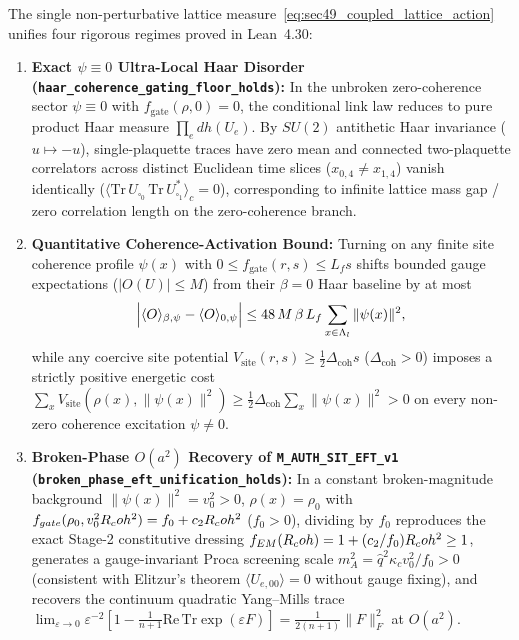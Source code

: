The single non-perturbative lattice measure~\eqref{eq:sec49_coupled_lattice_action} unifies four rigorous regimes proved in Lean~4.30:
\begin{enumerate}[leftmargin=2em]
  \item \textbf{Exact $\psi \equiv 0$ Ultra-Local Haar Disorder (\texttt{haar\_\allowbreak{}coherence\_\allowbreak{}gating\_\allowbreak{}floor\_\allowbreak{}holds}):} In the unbroken zero-coherence sector $\psi \equiv 0$ with $f_{\mathrm{gate}}(\rho,0) = 0$, the conditional link law reduces to pure product Haar measure $\prod_e dh(U_e)$. By $SU(2)$ antithetic Haar invariance ($u \mapsto -u$), single-plaquette traces have zero mean and connected two-plaquette correlators across distinct Euclidean time slices ($x_{0,4} \ne x_{1,4}$) vanish identically ($\langle \mathrm{Tr}\,U_{\square_0}\,\mathrm{Tr}\,U_{\square_1}^*\rangle_c = 0$), corresponding to infinite lattice mass gap / zero correlation length on the zero-coherence branch.
  \item \textbf{Quantitative Coherence-Activation Bound:} Turning on any finite site coherence profile $\psi(x)$ with $0 \le f_{\mathrm{gate}}(r,s) \le L_f s$ shifts bounded gauge expectations ($|O(U)| \le M$) from their $\beta = 0$ Haar baseline by at most
  \begin{equation}
  \Bigl|\langle O\rangle_{\beta,\psi} - \langle O\rangle_{0,\psi}\Bigr|
  \le 48\,M\,\beta\,L_f\sum_{x\in\Lambda_l}\|\psi(x)\|^2,
  \label{eq:sec49_48_bound}
  \end{equation}
  while any coercive site potential $V_{\mathrm{site}}(r,s) \ge \frac{1}{2}\Delta_{\mathrm{coh}} s$ ($\Delta_{\mathrm{coh}} > 0$) imposes a strictly positive energetic cost $\sum_x V_{\mathrm{site}}(\rho(x),\|\psi(x)\|^2) \ge \frac{1}{2}\Delta_{\mathrm{coh}}\sum_x\|\psi(x)\|^2 > 0$ on every non-zero coherence excitation $\psi \ne 0$.
  \item \textbf{Broken-Phase $O(a^2)$ Recovery of \texttt{M\_AUTH\_SIT\_EFT\_v1} (\texttt{broken\_\allowbreak{}phase\_\allowbreak{}eft\_\allowbreak{}unification\_\allowbreak{}holds}):} In a constant broken-magnitude background $\|\psi(x)\|^2 = v_0^2 > 0$, $\rho(x) = \rho_0$ with $f_{gate}(\rho_0, v_0^2R_coh^2) = f_0 + c_2R_coh^2$ ($f_0 > 0$), dividing by $f_0$ reproduces the exact Stage-2 constitutive dressing $f_{EM}(R_coh) = 1 + (c_2/f_0)R_coh^2 \ge 1$, generates a gauge-invariant Proca screening scale $m_A^2 = \hat{q}^2\kappa_c v_0^2 / f_0 > 0$ (consistent with Elitzur's theorem $\langle U_{e,00}\rangle = 0$ without gauge fixing), and recovers the continuum quadratic Yang--Mills trace $\lim_{\varepsilon\to 0}\varepsilon^{-2}[1 - \frac{1}{n+1}\mathrm{Re}\,\mathrm{Tr}\exp(\varepsilon F)] = \frac{1}{2(n+1)}\|F\|_F^2$ at $O(a^2)$.

\end{enumerate}
